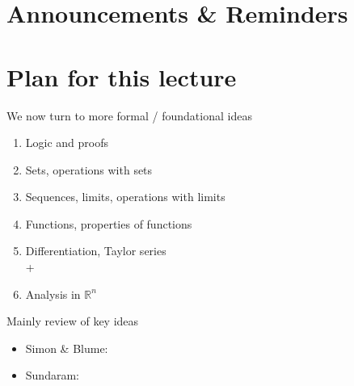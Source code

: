 \documentclass[letterpaper,10pt,english]{jupyterBook}
\begin{document}
\section{Announcements \& Reminders}
\label{\detokenize{03.set_theory:announcements-reminders}}

\section{Plan for this lecture}
\label{\detokenize{03.set_theory:plan-for-this-lecture}}
\sphinxAtStartPar
We now turn to more formal / foundational ideas
\begin{enumerate}
%
\item {} 
\sphinxAtStartPar
Logic and proofs

\item {} 
\sphinxAtStartPar
Sets, operations with sets

\item {} 
\sphinxAtStartPar
Sequences, limits, operations with limits

\item {} 
\sphinxAtStartPar
Functions, properties of functions

\item {} 
\sphinxAtStartPar
Differentiation, Taylor series\\
+

\item {} 
\sphinxAtStartPar
Analysis in \(\mathbb{R}^n\)

\end{enumerate}

\sphinxAtStartPar
Mainly review of key ideas

\sphinxAtStartPar
{}
\begin{itemize}
\item {} 
\sphinxAtStartPar
Simon \& Blume:

\item {} 
\sphinxAtStartPar
Sundaram:

\end{itemize}
\end{document}
